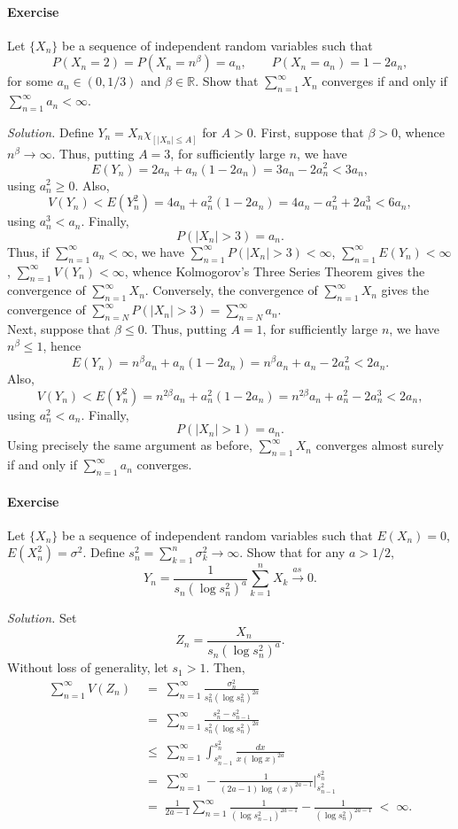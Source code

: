 \documentclass[10pt]{article}
\newcounter{prob}
\newcommand{\problem}{\stepcounter{prob}\paragraph{Exercise \arabic{prob}}}
\newcommand{\solution}{\textit{Solution.} }
\newcommand{\R}{\mathbb{R}}
\newcommand{\toas}{\overset{as\,}{\longrightarrow}}
\begin{document}
    \problem Let $\{X_n\}$ be a sequence of independent random variables such that
    \[
        P(X_n = 2) = P(X_n = n^\beta) = a_n, \qquad
        P(X_n = a_n) = 1 - 2a_n,
    \] for some $a_n \in (0, 1/3)$ and $\beta \in \R$. Show that $\sum_{n = 1}^\infty
    X_n$ converges if and only if $\sum_{n = 1}^\infty a_n < \infty$.

    \solution Define $Y_n = X_n \chi_{[|X_n| \leq A]}$ for $A > 0$. First, suppose that
    $\beta > 0$, whence $n^\beta \to \infty$. Thus, putting $A = 3$, for sufficiently
    large $n$, we have \[
        E(Y_n) = 2a_n + a_n(1 - 2a_n) = 3a_n -
        2a_n^2 < 3a_n,
    \] using $a_n^2 \geq 0$. Also, \[
        V(Y_n) < E(Y_n^2) = 4a_n + a_n^2(1 - 2a_n) = 4a_n
        - a_n^2 + 2a_n^3 < 6a_n,
    \] using $a_n^3 < a_n$. Finally, \[
        P(|X_n| > 3) = a_n.
    \] Thus, if $\sum_{n = 1}^\infty a_n < \infty$, we have $\sum_{n = 1}^\infty
    P(|X_n| > 3) < \infty$, $\sum_{n = 1}^\infty E(Y_n) < \infty$, $\sum_{n =
    1}^\infty V(Y_n) < \infty$, whence Kolmogorov's Three Series Theorem gives the
    convergence of $\sum_{n = 1}^\infty X_n$. Conversely, the convergence of $\sum_{n
    = 1}^\infty X_n$ gives the convergence of $\sum_{n = N}^\infty P(|X_n| > 3) =
    \sum_{n = N}^\infty a_n$. \\

    Next, suppose that $\beta \leq 0$. Thus, putting $A = 1$,
    for sufficiently large $n$, we have $n^\beta \leq 1$, hence \[
        E(Y_n) = n^\beta a_n + a_n(1 - 2a_n) = n^\beta a_n + a_n - 2a_n^2 < 2a_n.
    \] Also, \[
        V(Y_n) < E(Y_n^2) = n^{2\beta} a_n + a_n^2(1 - 2a_n) = n^{2\beta} a_n + a_n^2
        - 2a_n^3 < 2a_n,
    \] using $a_n^2 < a_n$. Finally, \[
        P(|X_n| > 1) = a_n.
    \] Using precisely the same argument as before, $\sum_{n = 1}^\infty X_n$
    converges almost surely if and only if $\sum_{n = 1}^\infty a_n$ converges.



    \problem Let $\{X_n\}$ be a sequence of independent random variables such that
    $E(X_n) = 0$, $E(X_n^2) = \sigma^2$. Define $s_n^2 = \sum_{k = 1}^n \sigma_k^2
    \to \infty$. Show that for any $a > 1/2$, \[
        Y_n = \frac{1}{s_n(\log{s_n^2})^a} \sum_{k = 1}^n X_k \toas 0.
    \]

    \solution Set \[
        Z_n = \frac{X_n}{s_n(\log{s_n^2})^a}.
    \] Without loss of generality, let $s_1 > 1$. Then, \begin{align*}
        \sum_{n = 1}^\infty V(Z_n)
        \;&=\; \sum_{n = 1}^\infty \frac{\sigma_n^2}{s_n^2(\log{s_n^2})^{2a}} \\
        \;&=\; \sum_{n = 1}^\infty \frac{s_n^2 - s_{n -
        1}^2}{s_n^2(\log{s_n^2})^{2a}} \\
        \;&\leq\; \sum_{n = 1}^\infty \int_{s_{n-1}^n}^{s_n^2}
        \frac{dx}{x(\log{x})^{2a}} \\
        \;&=\; \sum_{n = 1}^\infty -\frac{1}{(2a - 1)\log(x)^{2a - 1}}\Big|_{s_{n -
        1}^2}^{s_n^2} \\
        \;&=\; \frac{1}{2a - 1} \sum_{n = 1}^\infty \frac{1}{(\log{s_{n - 1}^2})^{2a
        - 1}} - \frac{1}{(\log{s_n^2})^{2a - 1}} \;<\; \infty.
    \end{align*}
\end{document}
